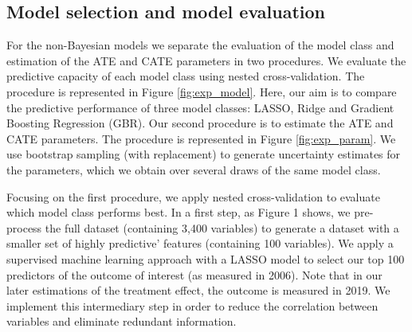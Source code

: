 \documentclass[12pt, a4paper]{article}
\begin{document}


\subsection{Model selection and model evaluation}

For the non-Bayesian models we separate the evaluation of the model class and estimation of the ATE and CATE parameters in two procedures. We evaluate the predictive capacity of each model class using nested cross-validation. The procedure is represented in Figure \ref{fig:exp_model}. Here, our aim is to compare the predictive performance of three model classes: LASSO, Ridge and Gradient Boosting Regression (GBR). Our second procedure is to estimate the ATE and CATE parameters. The procedure is represented in Figure \ref{fig:exp_param}. We use bootstrap sampling (with replacement) to generate uncertainty estimates for the parameters, which we obtain over several draws of the same model class. 

Focusing on the first procedure, we apply nested cross-validation to evaluate which model class performs best. In a first step, as Figure 1 shows, we pre-process the full dataset (containing 3,400 variables) to generate a dataset with a smaller set of highly predictive’ features (containing 100 variables). We apply a supervised machine learning approach with a LASSO model to select our top 100 predictors of the outcome of interest (as measured in 2006). Note that in our later estimations of the treatment effect, the outcome is measured in 2019. We implement this intermediary step in order to reduce the correlation between variables and eliminate redundant information. 
\end{document}

